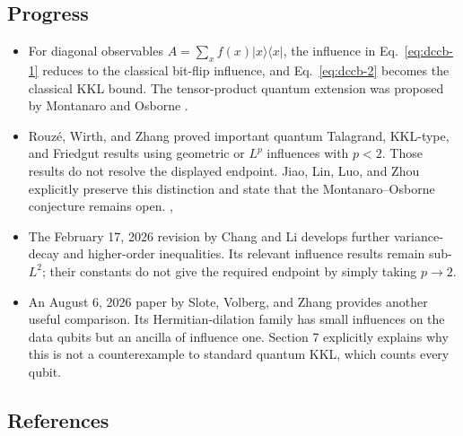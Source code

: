 \subsection*{Progress}

\begin{itemize}
  \item For diagonal observables $A=\sum_x f(x)|x\rangle\langle x|$, the influence in Eq.~\eqref{eq:dccb-1} reduces to the classical bit-flip influence, and Eq.~\eqref{eq:dccb-2} becomes the classical KKL bound. The tensor-product quantum extension was proposed by Montanaro and Osborne .

  \item Rouzé, Wirth, and Zhang proved important quantum Talagrand, KKL-type, and Friedgut results using geometric or $L^p$ influences with $p<2$. Those results do not resolve the displayed endpoint. Jiao, Lin, Luo, and Zhou explicitly preserve this distinction and state that the Montanaro–Osborne conjecture remains open. , 

  \item The February 17, 2026 revision by Chang and Li develops further variance-decay and higher-order inequalities. Its relevant influence results remain sub-$L^2$; their constants do not give the required endpoint by simply taking $p\to2$. 

  \item An August 6, 2026 paper by Slote, Volberg, and Zhang provides another useful comparison. Its Hermitian-dilation family has small influences on the data qubits but an ancilla of influence one. Section 7 explicitly explains why this is not a counterexample to standard quantum KKL, which counts every qubit. 
\end{itemize}

\subsection*{References}

